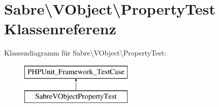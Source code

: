 \hypertarget{class_sabre_1_1_v_object_1_1_property_test}{}\section{Sabre\textbackslash{}V\+Object\textbackslash{}Property\+Test Klassenreferenz}
\label{class_sabre_1_1_v_object_1_1_property_test}
Klassendiagramm für Sabre\textbackslash{}V\+Object\textbackslash{}Property\+Test\+:\begin{figure}[H]
\begin{center}
\leavevmode
\includegraphics[height=2.000000cm]{class_sabre_1_1_v_object_1_1_property_test}
\end{center}
\end{figure}
